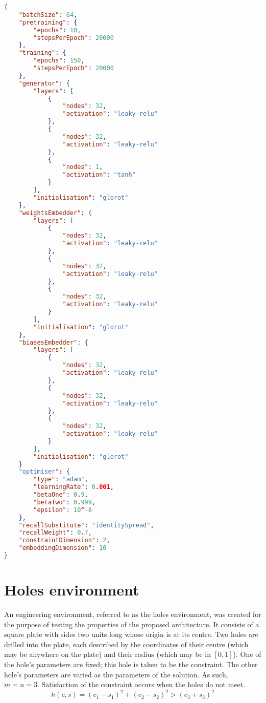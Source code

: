\documentclass[../main.tex]{subfiles}
\begin{document}
\begin{lstlisting}[language=json,firstnumber=1,caption={Experimental parameters for training a generator to match an arbitrary constraint satisfaction function parameterised by a constraint vector.},captionpos=b]
{
    "batchSize": 64,
    "pretraining": {
        "epochs": 10,
        "stepsPerEpoch": 20000
    },
    "training": {
        "epochs": 150,
        "stepsPerEpoch": 20000
    },
    "generator": {
        "layers": [
            {
                "nodes": 32,
                "activation": "leaky-relu"
            },
            {
                "nodes": 32,
                "activation": "leaky-relu"
            },
            {
                "nodes": 1,
                "activation": "tanh"
            }
        ],
        "initialisation": "glorot"
    },
    "weightsEmbedder": {
        "layers": [
            {
                "nodes": 32,
                "activation": "leaky-relu"
            },
            {
                "nodes": 32,
                "activation": "leaky-relu"
            },
            {
                "nodes": 32,
                "activation": "leaky-relu"
            }
        ],
        "initialisation": "glorot"
    },
    "biasesEmbedder": {
        "layers": [
            {
                "nodes": 32,
                "activation": "leaky-relu"
            },
            {
                "nodes": 32,
                "activation": "leaky-relu"
            },
            {
                "nodes": 32,
                "activation": "leaky-relu"
            }
        ],
        "initialisation": "glorot"
    }
    "optimiser": {
        "type": "adam",
        "learningRate": 0.001,
        "betaOne": 0.9,
        "betaTwo": 0.999,
        "epsilon": 10^-8
    },
    "recallSubstitute": "identitySpread",
    "recallWeight": 0.7,
    "constraintDimension": 2,
    "embeddingDimension": 10
}
\end{lstlisting}

\section{Holes environment} \label{appendix:holesEnvironment}

An engineering environment, referred to as the holes environment, was created for the purpose of testing the properties of the proposed architecture.
It consists of a square plate with sides two units long whose origin is at its centre.
Two holes are drilled into the plate, each described by the coordinates of their centre (which may be anywhere on the plate) and their radius (which may be in $[0,1]$).
One of the hole's parameters are fixed; this hole is taken to be the constraint.
The other hole's parameters are varied as the parameters of the solution.
As such, $m=n=3$.
Satisfaction of the constraint occurs when the holes do not meet.
\begin{equation}
    h(c,s)=(c_1-s_1)^2+(c_2-s_2)^2>(c_3+s_3)^2
\end{equation}
\end{document}
